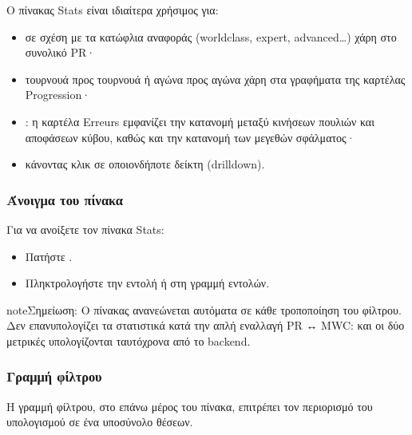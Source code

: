 \documentclass[letterpaper,10pt,greek]{sphinxmanual}
\begin{document}
\sphinxAtStartPar
Ο πίνακας Stats είναι ιδιαίτερα χρήσιμος για:
\begin{itemize}
\item {} 
\sphinxAtStartPar
{} σε σχέση με τα κατώφλια αναφοράς (world\sphinxhyphen{}class, expert, advanced…) χάρη στο συνολικό PR·

\item {} 
\sphinxAtStartPar
{} τουρνουά προς τουρνουά ή αγώνα προς αγώνα χάρη στα γραφήματα της καρτέλας Progression·

\item {} 
\sphinxAtStartPar
{}: η καρτέλα Erreurs εμφανίζει την κατανομή μεταξύ κινήσεων πουλιών και αποφάσεων κύβου, καθώς και την κατανομή των μεγεθών σφάλματος·

\item {} 
\sphinxAtStartPar
{} κάνοντας κλικ σε οποιονδήποτε δείκτη (drill\sphinxhyphen{}down).

\end{itemize}


\subsubsection{Άνοιγμα του πίνακα}
\label{\detokenize{manuel:ouverture-du-panneau}}
\sphinxAtStartPar
Για να ανοίξετε τον πίνακα Stats:
\begin{itemize}
\item {} 
\sphinxAtStartPar
Πατήστε .

\item {} 
\sphinxAtStartPar
Πληκτρολογήστε την εντολή  ή  στη γραμμή εντολών.

\end{itemize}

\begin{sphinxadmonition}{note}{Σημείωση:}
\sphinxAtStartPar
Ο πίνακας ανανεώνεται αυτόματα σε κάθε τροποποίηση του φίλτρου. Δεν επανυπολογίζει τα στατιστικά κατά την απλή εναλλαγή PR ↔ MWC: και οι δύο μετρικές υπολογίζονται ταυτόχρονα από το backend.
\end{sphinxadmonition}


\subsubsection{Γραμμή φίλτρου}
\label{\detokenize{manuel:barre-de-filtre}}
\sphinxAtStartPar
Η γραμμή φίλτρου, στο επάνω μέρος του πίνακα, επιτρέπει τον περιορισμό του υπολογισμού σε ένα υποσύνολο θέσεων.
\end{document}
